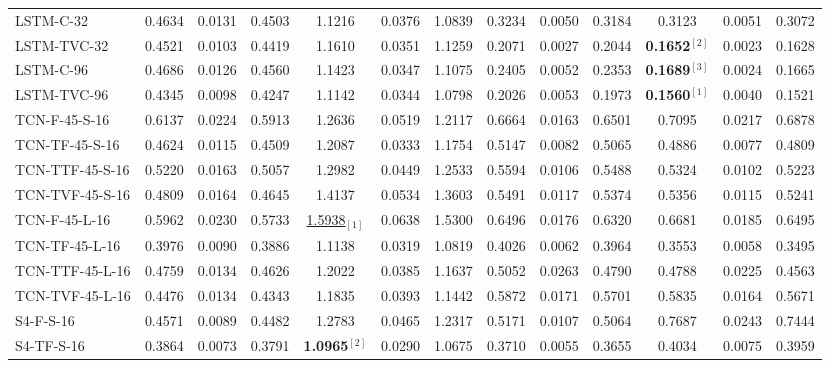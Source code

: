 \begin{table*}[ht!]
{\begin{tabular}{l c|cc >{\columncolor{gray!20}}c|cc c|cc >{\columncolor{gray!20}}c|cc}
            \hline
            LSTM-C-32 & 0.4634 & 0.0131 & 0.4503 & 1.1216 & 0.0376 & 1.0839 & 0.3234 & 0.0050 & 0.3184 & 0.3123 & 0.0051 & 0.3072\\
            LSTM-TVC-32 & 0.4521 & 0.0103 & 0.4419 & 1.1610 & 0.0351 & 1.1259 & 0.2071 & 0.0027 & 0.2044 & \textbf{0.1652}$^{[2]}$ & 0.0023 & 0.1628\\
            \hline
            LSTM-C-96 & 0.4686 & 0.0126 & 0.4560 & 1.1423 & 0.0347 & 1.1075 & 0.2405 & 0.0052 & 0.2353 & \textbf{0.1689}$^{[3]}$ & 0.0024 & 0.1665\\
            LSTM-TVC-96 & 0.4345 & 0.0098 & 0.4247 & 1.1142 & 0.0344 & 1.0798 & 0.2026 & 0.0053 & 0.1973 & \textbf{0.1560}$^{[1]}$ & 0.0040 & 0.1521\\
            \hline
            \hline
            TCN-F-45-S-16 & 0.6137 & 0.0224 & 0.5913 & 1.2636 & 0.0519 & 1.2117 & 0.6664 & 0.0163 & 0.6501 & 0.7095 & 0.0217 & 0.6878\\
            TCN-TF-45-S-16 & 0.4624 & 0.0115 & 0.4509 & 1.2087 & 0.0333 & 1.1754 & 0.5147 & 0.0082 & 0.5065 & 0.4886 & 0.0077 & 0.4809\\
            TCN-TTF-45-S-16 & 0.5220 & 0.0163 & 0.5057 & 1.2982 & 0.0449 & 1.2533 & 0.5594 & 0.0106 & 0.5488 & 0.5324 & 0.0102 & 0.5223\\
            TCN-TVF-45-S-16 & 0.4809 & 0.0164 & 0.4645 & 1.4137 & 0.0534 & 1.3603 & 0.5491 & 0.0117 & 0.5374 & 0.5356 & 0.0115 & 0.5241\\
            \hline
            TCN-F-45-L-16 & 0.5962 & 0.0230 & 0.5733 & \underline{1.5938}$_{[1]}$ & 0.0638 & 1.5300 & 0.6496 & 0.0176 & 0.6320 & 0.6681 & 0.0185 & 0.6495\\
            TCN-TF-45-L-16 & 0.3976 & 0.0090 & 0.3886 & 1.1138 & 0.0319 & 1.0819 & 0.4026 & 0.0062 & 0.3964 & 0.3553 & 0.0058 & 0.3495\\
            TCN-TTF-45-L-16 & 0.4759 & 0.0134 & 0.4626 & 1.2022 & 0.0385 & 1.1637 & 0.5052 & 0.0263 & 0.4790 & 0.4788 & 0.0225 & 0.4563\\
            TCN-TVF-45-L-16 & 0.4476 & 0.0134 & 0.4343 & 1.1835 & 0.0393 & 1.1442 & 0.5872 & 0.0171 & 0.5701 & 0.5835 & 0.0164 & 0.5671\\
            \hline
            \hline
            S4-F-S-16 & 0.4571 & 0.0089 & 0.4482 & 1.2783 & 0.0465 & 1.2317 & 0.5171 & 0.0107 & 0.5064 & 0.7687 & 0.0243 & 0.7444\\
            S4-TF-S-16 & 0.3864 & 0.0073 & 0.3791 & \textbf{1.0965}$^{[2]}$ & 0.0290 & 1.0675 & 0.3710 & 0.0055 & 0.3655 & 0.4034 & 0.0075 & 0.3959\\

\end{tabular}}
\end{table*}
